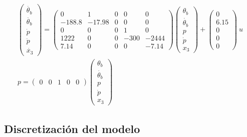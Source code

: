 \documentclass[a4paper,10pt]{article}
\begin{document}
\begin{gather*}
    \begin{pmatrix} 
        \dot{\theta_b} \\ \ddot{\theta_b} \\ \dot{p} \\ \ddot{p} \\ \dot{x_3}  
    \end{pmatrix} = 
    \begin{pmatrix}
        0 & 1 & 0 & 0 & 0 \\
        -188.8 & -17.98 & 0 & 0 & 0 \\
        0 & 0 & 0 & 1 & 0 \\ 
        1222 & 0 & 0 & -300 & -2444 \\ 
        7.14 & 0 & 0 & 0 & -7.14
    \end{pmatrix} 
    \begin{pmatrix} 
        \theta_b \\ \dot{\theta_b} \\ p \\ \dot{p} \\ x_3
    \end{pmatrix} +
    \begin{pmatrix} 0 \\ 6.15 \\ 0 \\ 0 \\ 0 \end{pmatrix} ~ u \\
    p = \begin{pmatrix} 0 & 0 & 1 & 0 & 0 \end{pmatrix}
    \begin{pmatrix} 
        \theta_b \\ \dot{\theta_b} \\ p \\ \dot{p} \\ x_3
    \end{pmatrix}
\end{gather*}

\subsection{Discretización del modelo}

\end{document}
